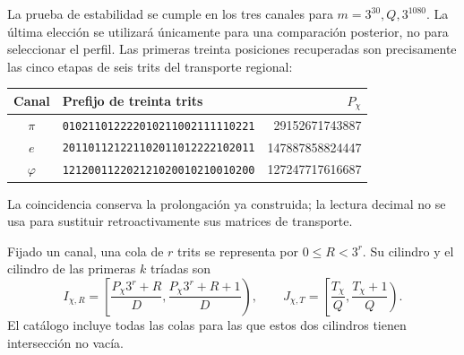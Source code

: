 La prueba de estabilidad se cumple en los tres canales para
\(m=3^{30},Q,3^{1080}\). La última elección se utilizará únicamente
para una comparación posterior, no para seleccionar el perfil. Las
primeras treinta posiciones recuperadas son precisamente las cinco
etapas de seis trits del transporte regional:
\begin{center}\small
\begin{tabular}{@{}c l r@{}}\toprule
Canal&Prefijo de treinta trits&\(P_\chi\)\\\midrule
\(\pi\)&\texttt{010211012222010211002111110221}&29152671743887\\
\(e\)&\texttt{201101121221102011012222102011}&147887858824447\\
\(\varphi\)&\texttt{121200112202121020010210010200}&127247717616687\\\bottomrule
\end{tabular}
\end{center}
La coincidencia conserva la prolongación ya construida; la lectura decimal
no se usa para sustituir retroactivamente sus matrices de transporte.

Fijado un canal, una cola de \(r\) trits se representa por
\(0\leq R<3^r\). Su cilindro y el cilindro de las primeras \(k\)
tríadas son
\begin{equation}
 I_{\chi,R}=\left[\frac{P_\chi3^r+R}{D},
                       \frac{P_\chi3^r+R+1}{D}\right),\qquad
 J_{\chi,T}=\left[\frac{T_\chi}{Q},\frac{T_\chi+1}{Q}\right).
 \label{x_reciprocidad:censo:dos-cilindros}
\end{equation}
El catálogo incluye todas las colas para las que estos dos cilindros
tienen intersección no vacía.

